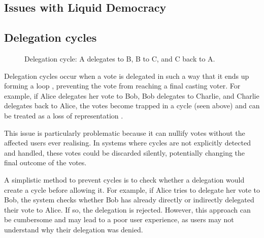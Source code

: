 
\subsection{Issues with Liquid Democracy}

\subsection*{Delegation cycles}
\begin{figure}[h]
  \centering
  \caption{Delegation cycle: A delegates to B, B to C, and C back to A.}
  \label{fig:triangle-cycle}
\end{figure}


Delegation cycles occur when a vote is delegated in such a way that it ends up forming a loop \citep{brill_liquid_2022}, preventing the vote from reaching a final casting voter. For example, if Alice delegates her vote to Bob, Bob delegates to Charlie, and Charlie delegates back to Alice, the votes become trapped in a cycle (seen above) and can be treated as a loss of representation \citep{christoff2017liquiddemocracyanalysisbinary}.

This issue is particularly problematic because it can nullify votes without the affected users ever realising. In systems where cycles are not explicitly detected and handled, these votes could be discarded silently, potentially changing the final outcome of the votes.

A simplistic method to prevent cycles is to check whether a delegation would create a cycle before allowing it. For example, if Alice tries to delegate her vote to Bob, the system checks whether Bob has already directly or indirectly delegated their vote to Alice. If so, the delegation is rejected. However, this approach can be cumbersome and may lead to a poor user experience, as users may not understand why their delegation was denied.

